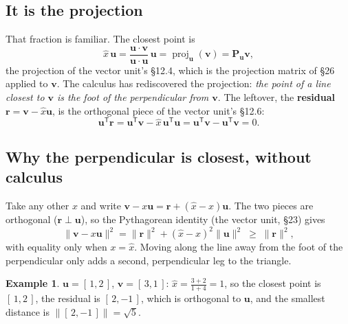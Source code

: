 \documentclass[11pt]{article}
\theoremstyle{plain}
\theoremstyle{definition}
\newtheorem{ex}{Example}[section]
\theoremstyle{remark}
\newcommand{\R}{\mathbb{R}}
\newcommand{\vc}[1]{\mathbf{#1}}
\newcommand{\mt}[1]{\mathbf{#1}}
\newcommand{\norm}[1]{\lVert #1\rVert}
\newcommand{\T}{^{\mathsf{T}}}
\newcommand{\proj}[2]{\operatorname{proj}_{#1}(#2)}
\begin{document}
\subsection{It is the projection}
That fraction is familiar. The closest point is
\[
  \hat x\,\vc{u}=\frac{\vc{u}\cdot\vc{v}}{\vc{u}\cdot\vc{u}}\,\vc{u}=\proj{\vc{u}}{\vc{v}}=\mt{P}_{\vc{u}}\vc{v},
\]
the projection of the vector unit's \S12.4, which is the projection matrix of
\S26 applied to $\vc{v}$. The calculus has rediscovered the projection: \emph{the
point of a line closest to $\vc{v}$ is the foot of the perpendicular from
$\vc{v}$}. The leftover, the \textbf{residual} $\vc{r}=\vc{v}-\hat x\vc{u}$, is the
orthogonal piece of the vector unit's \S12.6:
\[
  \vc{u}\T\vc{r}=\vc{u}\T\vc{v}-\hat x\,\vc{u}\T\vc{u}=\vc{u}\T\vc{v}-\vc{u}\T\vc{v}=0 .
\]

\subsection{Why the perpendicular is closest, without calculus}
Take any other $x$ and write
$\vc{v}-x\vc{u}=\vc{r}+(\hat x-x)\vc{u}$. The two pieces are orthogonal
($\vc{r}\perp\vc{u}$), so the Pythagorean identity (the vector unit, \S23) gives
\[
  \norm{\vc{v}-x\vc{u}}^{2}=\norm{\vc{r}}^{2}+(\hat x-x)^{2}\norm{\vc{u}}^{2}
  \;\ge\;\norm{\vc{r}}^{2},
\]
with equality only when $x=\hat x$. Moving along the line away from the foot of
the perpendicular only adds a second, perpendicular leg to the triangle.

\begin{ex}
\label{ex:line}
$\vc{u}=[\,1,2\,]$, $\vc{v}=[\,3,1\,]$: $\hat x=\frac{3+2}{1+4}=1$, so the
closest point is $[\,1,2\,]$, the residual is $[\,2,-1\,]$, which is orthogonal to
$\vc{u}$, and the smallest distance is $\norm{[\,2,-1\,]}=\sqrt5$.
\end{ex}

\begin{center}
\end{center}
\end{document}
